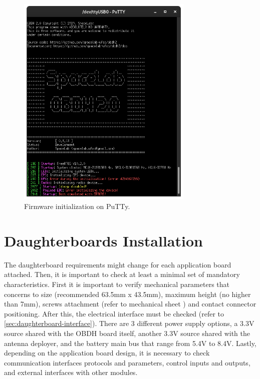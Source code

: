 \begin{figure}[!ht]
    \begin{center}
        \includegraphics[width=0.75\textwidth]{figures/putty-output.png}
        \caption{Firmware initialization on PuTTy.}
        \label{fig:putty-output}
    \end{center}
\end{figure}

\section{Daughterboards Installation}

The daughterboard requirements might change for each application board attached. Then, it is important to check at least a minimal set of mandatory characteristics. First it is important to verify mechanical parameters that concerns to size (recommended 63.5mm x 43.5mm), maximum height (no higher than 7mm), screws attachment (refer to mechanical sheet \cite{obdh2-draftsman}) and contact connector positioning. After this, the electrical interface must be checked (refer to \autoref{sec:daughterboard-interface}). There are 3 different power supply options, a 3.3V source shared with the OBDH board itself, another 3.3V source shared with the antenna deployer, and the battery main bus that range from 5.4V to 8.4V. Lastly, depending on the application board design, it is necessary to check communication interfaces protocols and parameters, control inputs and outputs, and external interfaces with other modules.